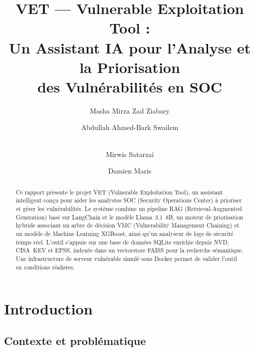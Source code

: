 \documentclass[runningheads]{llncs}
\begin{document}
\title{VET --- Vulnerable Exploitation Tool :\\
Un Assistant IA pour l'Analyse et la Priorisation\\
des Vulnérabilités en SOC}

\author{Masha Mirza Zad Ziabary \and
Abdullah Ahmed-Bark Swailem \and\\
Mirwis Satarzai \and
Damien Maris}



\maketitle

\begin{abstract}
Ce rapport présente le projet VET (Vulnerable Exploitation Tool), un assistant intelligent conçu pour aider les analystes SOC (Security Operations Center) à prioriser et gérer les vulnérabilités. Le système combine un pipeline RAG (Retrieval-Augmented Generation) basé sur LangChain et le modèle Llama~3.1~8B, un moteur de priorisation hybride associant un arbre de décision VMC (Vulnerability Management Chaining) et un modèle de Machine Learning XGBoost, ainsi qu'un analyseur de logs de sécurité temps réel. L'outil s'appuie sur une base de données SQLite enrichie depuis NVD, CISA~KEV et EPSS, indexée dans un vectorstore FAISS pour la recherche sémantique. Une infrastructure de serveur vulnérable simulé sous Docker permet de valider l'outil en conditions réalistes.

\end{abstract}


\section{Introduction}

\subsection{Contexte et problématique}
\end{document}

